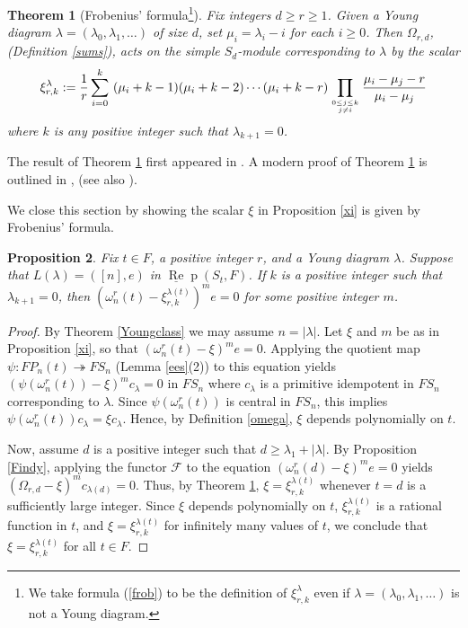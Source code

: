 \documentclass{amsart}
\newtheorem{theorem}{Theorem}[section]
\newtheorem{proposition}[theorem]{Proposition}
\theoremstyle{definition}
\def\uRep{\underline{\operatorname{Re}}\!\operatorname{p}}
\renewcommand{\1}{_{(1)}}
\renewcommand{\2}{_{(2)}}
\newcommand{\3}{_{(3)}}
\newcommand{\4}{_{(4)}}
\newcommand{\cat}{\mathcal}
\begin{document}

\begin{theorem}[Frobenius' formula\footnote{We take formula (\ref{frob}) to be the definition of $\xi_{r, k}^\lambda$ even if $\lambda=(\lambda_0, \lambda_1,\ldots)$  is not a Young diagram.}]\label{fro} Fix integers $d\geq r\geq 1$.  Given a Young diagram $\lambda=(\lambda_0, \lambda_1,\ldots)$ of size $d$, set $\mu_i=\lambda_i-i$ for each $i\geq 0$.  Then $\Omega_{r, d}$, (Definition \ref{sums}), acts on the simple $S_d$-module corresponding to $\lambda$ by the scalar 
\begin{equation}\label{frob}\xi^\lambda_{r, k}:=\frac{1}{r}\sum_{i=0}^k~(\mu_i+k-1)(\mu_i+k-2)\cdots(\mu_i+k-r)\prod_{0\leq j\leq k\atop j\not=i}\frac{\mu_i-\mu_j-r}{\mu_i-\mu_j}
\end{equation} where $k$ is any positive integer such that $\lambda_{k+1}=0$.
\end{theorem}

The result of Theorem \ref{fro}  first appeared in \cite{Frob}.  A modern proof of Theorem \ref{fro} is outlined in \cite[exercise 4.17]{MR1153249}, (see also \cite[Example 7 in section I.7]{MR1354144}).

We close this section by showing the scalar $\xi$ in Proposition \ref{xi} is given by Frobenius' formula.

\begin{proposition}\label{minpoly} Fix $t\in F$, a positive integer $r$, and a Young diagram $\lambda$.  Suppose that $L(\lambda)=([n], e)$ in $\uRep(S_t, F)$.   If $k$ is a positive integer such that $\lambda_{k+1}=0$, then $(\omega_n^r(t)-\xi^{\lambda(t)}_{r, k})^me=0$ for some positive integer $m$.
\end{proposition}

\begin{proof} By Theorem \ref{Youngclass} we may assume $n=|\lambda|$.  Let $\xi$ and $m$ be as in Proposition \ref{xi}, so that $(\omega_n^r(t)-\xi)^me=0$.  Applying the quotient map $\psi:FP_n(t)\twoheadrightarrow FS_n$ (Lemma \ref{ees}(2)) to this equation yields $(\psi(\omega_n^r(t))-\xi)^mc_\lambda=0$ in $FS_n$ where $c_\lambda$ is a primitive idempotent in $FS_n$ corresponding to $\lambda$.  Since $\psi(\omega_n^r(t))$ is central in $FS_n$, this implies $\psi(\omega_n^r(t))c_\lambda=\xi c_\lambda$.  Hence, by Definition \ref{omega}, $\xi$ depends polynomially on $t$.  

Now, assume $d$ is a positive integer such that $d\geq\lambda_1+|\lambda|$.  By Proposition \ref{Findy}, applying the functor $\cat{F}$ to the equation $(\omega_n^r(d)-\xi)^me=0$ yields $(\Omega_{r, d}-\xi)^mc_{\lambda(d)}=0$.  Thus, by Theorem \ref{fro}, $\xi=\xi^{\lambda(t)}_{r, k}$ whenever $t=d$ is a sufficiently large integer.  Since $\xi$ depends polynomially on $t$, $\xi^{\lambda(t)}_{r, k}$ is a rational function in $t$, and $\xi=\xi^{\lambda(t)}_{r, k}$ for infinitely many values of $t$, we conclude that $\xi=\xi^{\lambda(t)}_{r, k}$ for all $t\in F$.
\end{proof}
\end{document}
